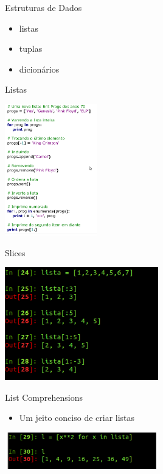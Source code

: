 \documentclass{beamer}
\begin{document}
\begin{frame}{Estruturas de Dados}
 \begin{itemize}
  \item listas
  \item tuplas
  \item dicion\'arios
 \end{itemize}

\end{frame}

\begin{frame}{Listas}
 \begin{center}
   \includegraphics[width=0.3\textwidth]{images/listas.png}
\end{center}
 
\end{frame}
\begin{frame}{Slices}
 \begin{center}
   \includegraphics[width=0.5\textwidth]{images/slice.png}
\end{center}
\end{frame}

\begin{frame}{List Comprehensions}
 \begin{itemize}
  \item Um jeito conciso de criar listas
 \end{itemize}

 \begin{center}
   \includegraphics[width=0.5\textwidth]{images/comprehensions.png}
\end{center}
\end{frame}
\end{document}
